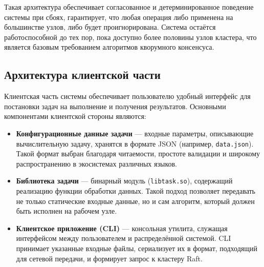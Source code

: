 Такая архитектура обеспечивает согласованное и детерминированное поведение
системы при сбоях, гарантирует, что любая операция либо применена на
большинстве узлов, либо будет проигнорирована. Система остаётся работоспособной
до тех пор, пока доступно более половины узлов кластера, что является базовым
требованием алгоритмов кворумного консенсуса.

\subsection{Архитектура клиентской части}

Клиентская часть системы обеспечивает пользователю удобный интерфейс
для постановки задач на выполнение и получения результатов.
Основными компонентами клиентской стороны являются:
\begin{itemize}
    \item \textbf{Конфигурационные данные задачи} — входные параметры,
    описывающие вычислительную задачу, хранятся в формате JSON
    (например, \texttt{data.json}). Такой формат выбран благодаря
    читаемости, простоте валидации и широкому распространению
    в экосистемах различных языков.
    \item \textbf{Библиотека задачи} — бинарный модуль
    (\texttt{libtask.so}), содержащий реализацию функции обработки данных.
    Такой подход позволяет передавать не только статические входные данные,
    но и сам алгоритм, который должен быть исполнен на рабочем узле.
    \item \textbf{Клиентское приложение (CLI)} — консольная утилита,
    служащая интерфейсом между пользователем и распределённой системой.
    CLI принимает указанные входные файлы, сериализует их в формат,
    подходящий для сетевой передачи, и формирует запрос к кластеру Raft.
\end{itemize}


